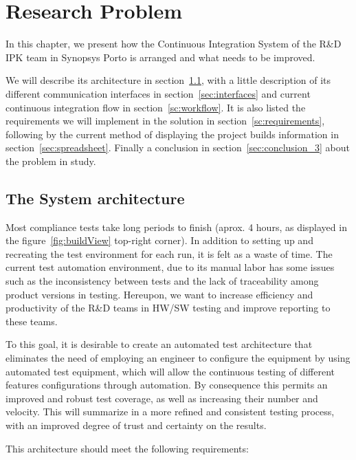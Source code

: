 \chapter{Research Problem} \label{chap:research_problem}

In this chapter, we present how the Continuous Integration System of the R\&D IPK team in Synopsys Porto is arranged and what needs to be improved. 

We will describe its architecture in section~\ref{sec:res_system}, with a little description of its different communication interfaces in section~\ref{sec:interfaces} and current continuous integration flow in section~\ref{sc:workflow}. It is also listed the requirements we will implement in the solution in section~\ref{sc:requirements}, following by the current method of displaying the project builds information in section~\ref{sec:spreadsheet}.
Finally a conclusion in section~\ref{sec:conclusion_3} about the problem in study.

\section{The System architecture}\label{sec:res_system}

Most compliance tests take long periods to finish (aprox. 4 hours, as displayed in the figure~\ref{fig:buildView} top-right corner). In addition to setting up and recreating the test environment for each run, it is felt as a waste of time. The current test automation environment, due to its manual labor has some issues such as the inconsistency between tests and the lack of traceability among product versions in testing. Hereupon, we want to increase efficiency and productivity of the R\&D teams in HW/SW testing and improve reporting to these teams.

To this goal, it is desirable to create an automated test architecture that eliminates the need of employing an engineer to configure the equipment by using automated test equipment, which will allow the continuous testing of different features configurations through automation. By consequence this permits an improved and robust test coverage, as well as increasing their number and velocity. This will summarize in a more refined and consistent testing process, with an improved degree of trust and certainty on the results.

This architecture should meet the following requirements:

